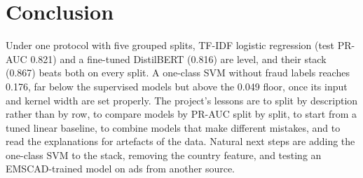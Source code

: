 \section{Conclusion}
\label{conclusion}

Under one protocol with five grouped splits, TF-IDF logistic regression (test PR-AUC
0.821) and a fine-tuned DistilBERT (0.816) are level, and their stack (0.867) beats both on every
split. A one-class SVM without fraud labels reaches 0.176, far below the supervised models but
above the 0.049 floor, once its input and kernel width are set properly. The project's lessons are
to split by description rather than by row, to compare models by PR-AUC split by split, to start
from a tuned linear baseline, to combine models that make different mistakes, and to read the
explanations for artefacts of the data. Natural next steps are adding the one-class SVM to the
stack, removing the country feature, and testing an EMSCAD-trained model on ads from another source.
